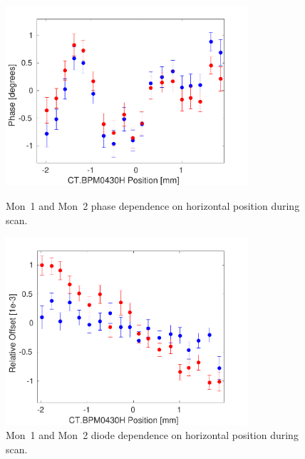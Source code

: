 \begin{figure}
  \centering
  \includegraphics[width=0.8\textwidth]{Figures/phaseMons/horizontalPosScan}
  \caption{Mon~1 and Mon~2 phase dependence on horizontal position during scan.}
  \label{f:horizontalPosScan}
  \includegraphics[width=0.8\textwidth]{Figures/phaseMons/horizontalScanDiode}
  \caption{Mon~1 and Mon~2 diode dependence on horizontal position during scan.}
  \label{f:horizontalScanDiode}
\end{figure}

